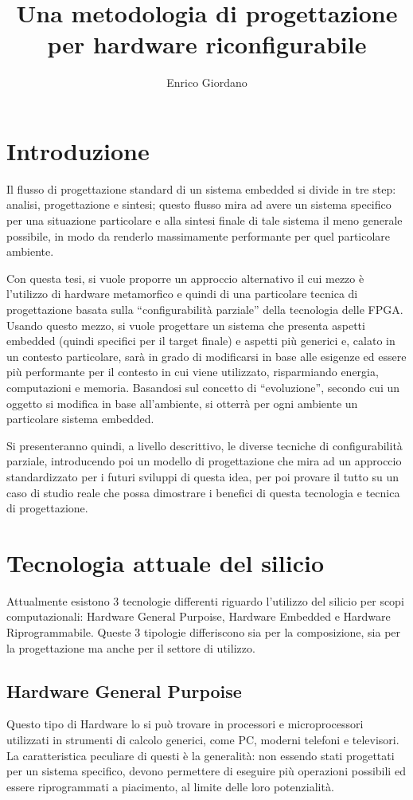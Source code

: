 \documentclass[11pt]{article} %
\title{Una metodologia di progettazione per hardware riconfigurabile}
\author{Enrico Giordano}
\date{} %
\begin{document}
\maketitle

\section{Introduzione}

Il flusso di progettazione standard di un sistema embedded si divide in tre step: analisi, progettazione e sintesi; questo flusso mira ad avere un sistema specifico per una situazione particolare e alla sintesi finale di tale sistema il meno generale possibile, in modo da renderlo massimamente performante per quel particolare ambiente. 

Con questa tesi, si vuole proporre un approccio alternativo il cui mezzo è l'utilizzo di hardware metamorfico e quindi di una particolare tecnica di progettazione basata sulla ``configurabilità parziale'' della tecnologia delle FPGA. Usando questo mezzo, si vuole progettare un sistema che presenta aspetti embedded (quindi specifici per il target finale) e aspetti più generici e, calato in un contesto particolare, sarà in grado di modificarsi in base alle esigenze ed essere più performante per il contesto in cui viene utilizzato, risparmiando energia, computazioni e memoria. Basandosi sul concetto di ``evoluzione'', secondo cui un oggetto si modifica in base all'ambiente, si otterrà per ogni ambiente un particolare sistema embedded. 

Si presenteranno quindi, a livello descrittivo, le diverse tecniche di configurabilità parziale, introducendo poi un modello di progettazione che mira ad un approccio standardizzato per i futuri sviluppi di questa idea, per poi provare il tutto su un caso di studio reale che possa dimostrare i benefici di questa tecnologia e tecnica di progettazione.

\section{Tecnologia attuale del silicio}
Attualmente esistono 3 tecnologie differenti riguardo l'utilizzo del silicio per scopi computazionali: Hardware General Purpoise, Hardware Embedded e Hardware Riprogrammabile. Queste 3 tipologie differiscono sia per la composizione, sia per la progettazione ma anche per il settore di utilizzo.

\subsection{Hardware General Purpoise}
Questo tipo di Hardware lo si può trovare in processori e microprocessori utilizzati in strumenti di calcolo generici, come PC, moderni telefoni e televisori. La caratteristica peculiare di questi è la generalità: non essendo stati progettati per un sistema specifico, devono permettere di eseguire più operazioni possibili ed essere riprogrammati a piacimento, al limite delle loro potenzialità.
\end{document}
